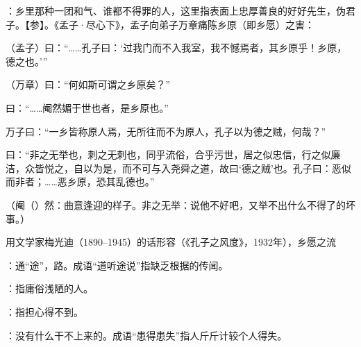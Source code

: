 {
\item {}：乡里那种一团和气、谁都不得罪的人，这里指表面上忠厚善良的好好先生，伪君子。【参】。《孟子·尽心下》，孟子向弟子万章痛陈乡原（即乡愿）之害：
\begin{lyquotepara}
（孟子）曰：“……孔子曰：‘过我门而不入我室，我不憾焉者，其乡原乎！乡原，德之也。’”

（万章）曰：“何如斯可谓之乡原矣？”

曰：“……阉然媚于世也者，是乡原也。”

万子曰：“一乡皆称原人焉，无所往而不为原人，孔子以为德之贼，何哉？”

曰：“非之无举也，刺之无刺也，同乎流俗，合乎污世，居之似忠信，行之似廉洁，众皆悦之，自以为是，而不可与入尧舜之道，故曰‘德之贼’也。孔子曰：恶似而非者；……恶乡原，恐其乱德也。”
\end{lyquotepara}
（阉（）然：曲意逢迎的样子。非之无举：说他不好吧，又举不出什么不得了的坏事。）

用文学家梅光迪（1890--1945）的话形容（《孔子之风度》，1932年），乡愿之流
}
{}


{
\item {}：通“途”，路。成语“道听途说”指缺乏根据的传闻。
}
{}


{
\item {}：指庸俗浅陋的人。
\item {}：指担心得不到。
\item {}：没有什么干不上来的。成语“患得患失”指人斤斤计较个人得失。
}
{}


